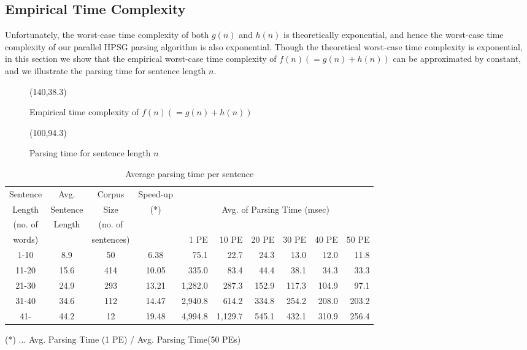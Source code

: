 \subsection{Empirical Time Complexity}
  Unfortunately, the worst-case time complexity of both $g(n)$ and
$h(n)$ is theoretically exponential, and hence the worst-case time
complexity of our parallel HPSG parsing algorithm is also exponential.
Though the theoretical worst-case time complexity is exponential, in
this section we show that the empirical worst-case time complexity of
$f(n) (= g(n) + h(n))$ can be approximated by constant, and we
illustrate the parsing time for sentence length $n$.


\begin{figure}[t]
\begin{center}
\atari(140,38.3)
\caption{Empirical time complexity of $f(n) (= g(n) + h(n))$}
\label{fig:g-h}
\end{center}
\end{figure}

\begin{figure}[t]
\begin{center}
\atari(100,94.3)
\caption{Parsing time for sentence length $n$}
\label{fig:s-parsing-time}
\end{center}
\end{figure}

\begin{table}[t]
\begin{center}
{\footnotesize	
\begin{tabular}{|c|c|c|c|r|r|r|r|r|r|}
\hline
Sentence	& Avg. 		& Corpus	& Speed-up	& \multicolumn{6}{c|}{}\\
Length		& Sentence	& Size		& (*)		& \multicolumn{6}{c|}{Avg. of Parsing Time (msec)}\\
(no. of		& Length	& (no. of	& 		& \multicolumn{6}{c|}{}\\
\cline{5-10}
words)		& 		& sentences)	& 		& 1 PE& 10 PE& 20 PE& 30 PE& 40 PE& 50 PE\\
\hline
1-10		&  8.9 &  50	& 6.38  &  75.1 & 22.7 &  24.3 &  13.0 &  12.0 &  11.8\\
11-20		& 15.6 & 414	& 10.05 & 335.0 & 83.4 &  44.4 &  38.1 &  34.3 &  33.3\\
21-30		& 24.9 & 293	& 13.21 &1,282.0 &287.3 & 152.9 & 117.3 & 104.9 &  97.1\\
31-40		& 34.6 & 112	& 14.47 &2,940.8 &614.2 & 334.8 & 254.2 & 208.0 & 203.2\\
41-		& 44.2 &  12	& 19.48 &4,994.8 &1,129.7& 545.1 & 432.1 & 310.9 & 256.4\\
\hline
\end{tabular}

(*) ... Avg. Parsing Time (1 PE) / Avg. Parsing Time(50 PEs)

\caption{Average parsing time per sentence}
\label{tab:corpora}
}
\end{center}
\end{table}

